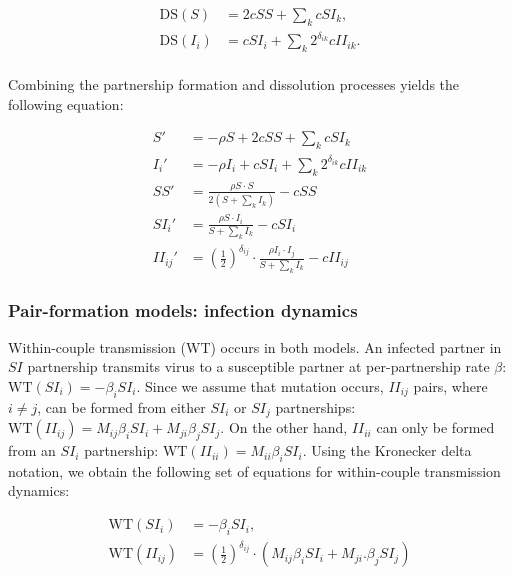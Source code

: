 \documentclass[10pt,letterpaper]{article}
\newcommand{\khalf}{\left(\frac{1}{2}\right)^{\delta_{ij}}}  %
\newcommand{\DS}{\textrm{DS}}
\newcommand{\WT}{\textrm{WT}}
\begin{document}
\begin{equation}
\begin{aligned}
\DS(S) &= 2 c SS + \sum_k c SI_k, \\
\DS(I_i) &= c SI_i + \sum_k 2^{\delta_{ik}} c II_{ik}.\\
\end{aligned}
\end{equation}

Combining the partnership formation and dissolution processes yields the following equation:

\begin{equation}
\begin{aligned}
S' &= - \rho S + 2 c SS + \sum_k c SI_k \\
I_i' &= - \rho I_i + c SI_i + \sum_k 2^{\delta_{ik}} c II_{ik}\\
SS' &= \frac{\rho S \cdot S}{2 (S + \sum_k I_k)} - c SS\\
SI_i' &= \frac{\rho S \cdot I_i}{S + \sum_k I_k} - c SI_i\\
II_{ij}' &= \khalf \cdot \frac{\rho I_i \cdot I_j}{S + \sum_k I_k} - c II_{ij}
\end{aligned}
\end{equation}

\subsubsection*{Pair-formation models: infection dynamics}

Within-couple transmission (WT) occurs in both models. An infected partner in $SI$ partnership transmits virus to a susceptible partner at per-partnership rate $\beta$: $\WT(SI_i) = - \beta_i SI_i$. Since we assume that mutation occurs, $II_{ij}$ pairs, where $i \neq j$, can be formed from either $SI_i$ or $SI_j$ partnerships: $\WT(II_{ij}) = M_{ij} \beta_i SI_i + M_{ji} \beta_j SI_j$. On the other hand, $II_{ii}$ can only be formed from an $SI_i$ partnership: $\WT(II_{ii}) = M_{ii} \beta_i SI_i$. Using the Kronecker delta notation, we obtain the following set of equations for within-couple transmission dynamics:

\begin{equation}
\begin{aligned}
\WT(SI_i) &= - \beta_i SI_i,\\
\WT(II_{ij}) &=  \khalf \cdot (M_{ij} \beta_i SI_i + M_{ji}. \beta_j SI_j)
\end{aligned}
\end{equation}
\end{document}
